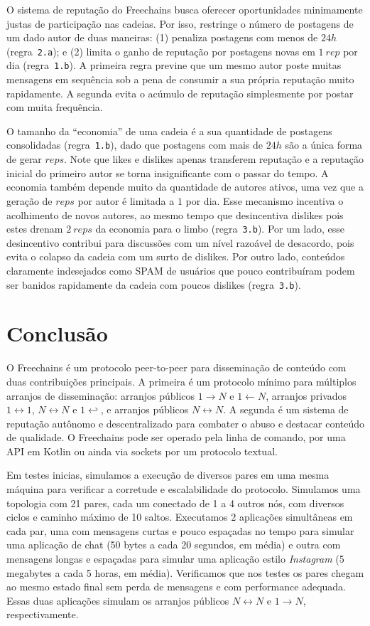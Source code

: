 \documentclass[12pt]{article}
\newcommand{\FC} {Freechains\xspace}
\newcommand{\Xon} {$1{\rightarrow}N$\xspace}
\newcommand{\Xno} {$1{\leftarrow}N$\xspace}
\newcommand{\Xnn} {$N{\leftrightarrow}N$\xspace}
\newcommand{\Xoo} {$1{\leftrightarrow}1$\xspace}
\newcommand{\Xo}  {$1{\hookleftarrow}$\xspace}
\begin{document}
O sistema de reputação do \FC busca oferecer oportunidades minimamente justas
de participação nas cadeias.
Por isso, restringe o número de postagens de um dado autor de duas maneiras:
    (1) penaliza postagens com menos de $24h$ (regra~\texttt{2.a}); e
    (2) limita o ganho de reputação por postagens novas em $1~rep$ por dia
        (regra~\texttt{1.b}).
A primeira regra previne que um mesmo autor poste muitas mensagens em sequência
sob a pena de consumir a sua própria reputação muito rapidamente.
A segunda evita o acúmulo de reputação simplesmente por postar com muita
frequência.

O tamanho da ``economia'' de uma cadeia é a sua quantidade de postagens
consolidadas (regra~\texttt{1.b}), dado que postagens com mais de $24h$ são a
única forma de gerar $reps$.
Note que likes e dislikes apenas transferem reputação e a reputação inicial do
primeiro autor se torna insignificante com o passar do tempo.
A economia também depende muito da quantidade de autores ativos, uma vez que
a geração de $reps$ por autor é limitada a $1$ por dia.
Esse mecanismo incentiva o acolhimento de novos autores, ao mesmo tempo que
desincentiva dislikes pois estes drenam $2~reps$ da economia para o limbo
(regra~\texttt{3.b}).
Por um lado, esse desincentivo contribui para discussões com um nível razoável
de desacordo, pois evita o colapso da cadeia com um surto de dislikes.
Por outro lado, conteúdos claramente indesejados como SPAM de usuários que
pouco contribuíram podem ser banidos rapidamente da cadeia com poucos dislikes
(regra~\texttt{3.b}).

\section{Conclusão}
\label{sec.conclusion}

O \FC é um protocolo peer-to-peer para disseminação de conteúdo com duas
contribuições principais.
A primeira é um protocolo mínimo para múltiplos arranjos de disseminação:
arranjos públicos \Xon e \Xno, arranjos privados \Xoo, \Xnn e \Xo, e arranjos
públicos \Xnn.
A segunda é um sistema de reputação autônomo e descentralizado para combater
o abuso e destacar conteúdo de qualidade.
O \FC pode ser operado pela linha de comando, por uma API em Kotlin ou ainda
via sockets por um protocolo textual.

Em testes inicias, simulamos a execução de diversos pares em uma mesma máquina
para verificar a corretude e escalabilidade do protocolo.
Simulamos uma topologia com 21 pares, cada um conectado de 1 a 4 outros nós,
com diversos ciclos e caminho máximo de 10 saltos.
Executamos 2 aplicações simultâneas em cada par, uma com mensagens curtas e
pouco espaçadas no tempo para simular uma aplicação de chat (50 bytes a cada 20
segundos, em média) e outra com mensagens longas e espaçadas para simular uma
aplicação estilo \emph{Instagram} (5 megabytes a cada 5 horas, em média).
Verificamos que nos testes os pares chegam ao mesmo estado final sem perda de
mensagens e com performance adequada.
Essas duas aplicações simulam os arranjos públicos \Xnn e \Xon,
respectivamente.
\end{document}
